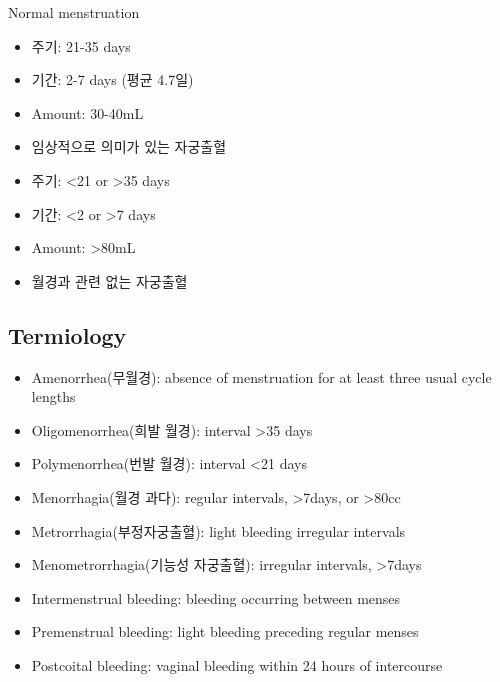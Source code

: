 \begin{commentbox}{Normal menstruation}
	\begin{itemize}[-]\tightlist
	\item 주기: 21-35 days  
	\item 기간: 2-7 days (평균 4.7일) 
	\item Amount: 30-40mL 
	\end{itemize}
	\begin{itemize}[-]\tightlist
	\item 임상적으로 의미가 있는 자궁출혈
	\item 주기: <21 or >35 days
	\item 기간: <2 or >7 days
	\item Amount: >80mL
	\item 월경과 관련 없는 자궁출혈 
	\end{itemize}
\end{commentbox}

\subsection{Termiology}
\begin{itemize}\tightlist
\item Amenorrhea(무월경): absence of menstruation for at least three usual cycle lengths
\item Oligomenorrhea(희발 월경): interval >35 days 
\item Polymenorrhea(번발 월경): interval <21 days 
\item Menorrhagia(월경 과다): regular intervals, >7days, or >80cc 
\item Metrorrhagia(부정자궁출혈): light bleeding irregular intervals 
\item Menometrorrhagia(기능성 자궁출혈): irregular intervals, >7days 
\item Intermenstrual bleeding: bleeding occurring between menses 
\item Premenstrual bleeding: light bleeding preceding regular menses 
\item Postcoital bleeding: vaginal bleeding within 24 hours of intercourse 
\end{itemize}

